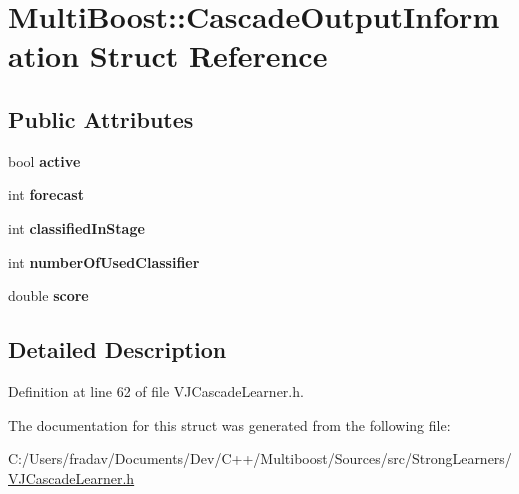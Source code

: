 \hypertarget{structMultiBoost_1_1CascadeOutputInformation}{\section{Multi\-Boost\-:\-:Cascade\-Output\-Information Struct Reference}
\label{structMultiBoost_1_1CascadeOutputInformation}
}
\subsection*{Public Attributes}
\begin{DoxyCompactItemize}
\item 
\hypertarget{structMultiBoost_1_1CascadeOutputInformation_ae096764687b1099a5da9be51686ac493}{bool {\bfseries active}}\label{structMultiBoost_1_1CascadeOutputInformation_ae096764687b1099a5da9be51686ac493}

\item 
\hypertarget{structMultiBoost_1_1CascadeOutputInformation_a5faf0ecb5140fabc2471ae3111fa528e}{int {\bfseries forecast}}\label{structMultiBoost_1_1CascadeOutputInformation_a5faf0ecb5140fabc2471ae3111fa528e}

\item 
\hypertarget{structMultiBoost_1_1CascadeOutputInformation_a597760a011e4aa234137db69afb5c3ee}{int {\bfseries classified\-In\-Stage}}\label{structMultiBoost_1_1CascadeOutputInformation_a597760a011e4aa234137db69afb5c3ee}

\item 
\hypertarget{structMultiBoost_1_1CascadeOutputInformation_af49354cb375a5a023b65fc9d840a9549}{int {\bfseries number\-Of\-Used\-Classifier}}\label{structMultiBoost_1_1CascadeOutputInformation_af49354cb375a5a023b65fc9d840a9549}

\item 
\hypertarget{structMultiBoost_1_1CascadeOutputInformation_af0351866a6424779062465a9ad6cab50}{double {\bfseries score}}\label{structMultiBoost_1_1CascadeOutputInformation_af0351866a6424779062465a9ad6cab50}

\end{DoxyCompactItemize}


\subsection{Detailed Description}


Definition at line 62 of file V\-J\-Cascade\-Learner.\-h.



The documentation for this struct was generated from the following file\-:\begin{DoxyCompactItemize}
\item 
C\-:/\-Users/fradav/\-Documents/\-Dev/\-C++/\-Multiboost/\-Sources/src/\-Strong\-Learners/\hyperlink{VJCascadeLearner_8h}{V\-J\-Cascade\-Learner.\-h}\end{DoxyCompactItemize}
